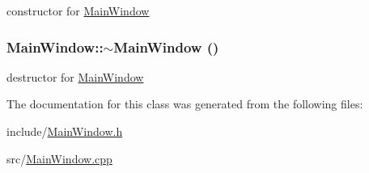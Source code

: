 constructor for \hyperlink{classMainWindow}{MainWindow} \hypertarget{classMainWindow_ae98d00a93bc118200eeef9f9bba1dba7}{
\subsubsection[{$\sim$MainWindow}]{\setlength{\rightskip}{0pt plus 5cm}MainWindow::$\sim$MainWindow ()}}
\label{classMainWindow_ae98d00a93bc118200eeef9f9bba1dba7}


destructor for \hyperlink{classMainWindow}{MainWindow} 

The documentation for this class was generated from the following files:\begin{DoxyCompactItemize}
\item 
include/\hyperlink{MainWindow_8h}{MainWindow.h}\item 
src/\hyperlink{MainWindow_8cpp}{MainWindow.cpp}\end{DoxyCompactItemize}
